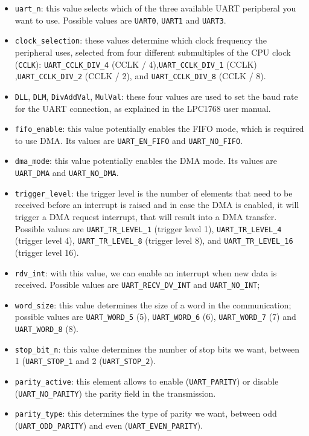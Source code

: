 \begin{itemize}
    \item \texttt{uart\_n}: this value selects which of the three available UART peripheral you want to use. Possible values are \texttt{UART0}, \texttt{UART1} and \texttt{UART3}. 
    \item \texttt{clock\_selection}: these values determine which clock frequency the peripheral uses, selected from four different submultiples of the CPU clock (\texttt{CCLK}): \texttt{UART\_CCLK\_DIV\_4} (CCLK / 4),\texttt{UART\_CCLK\_DIV\_1} (CCLK) ,\texttt{UART\_CCLK\_DIV\_2} (CCLK / 2), and \texttt{UART\_CCLK\_DIV\_8} (CCLK / 8).
    \item \texttt{DLL}, \texttt{DLM}, \texttt{DivAddVal}, \texttt{MulVal}: these four values are used to set the baud rate for the UART connection, as explained in the LPC1768 user manual.
    \item \texttt{fifo\_enable}: this value potentially enables the FIFO mode, which is required to use DMA. Its values are \texttt{UART\_EN\_FIFO} and \texttt{UART\_NO\_FIFO}.
    \item \texttt{dma\_mode}: this value potentially enables the DMA mode. Its values are \texttt{UART\_DMA} and \texttt{UART\_NO\_DMA}.
    \item \texttt{trigger\_level}: the trigger level is the number of elements that need to be received before an interrupt is raised and in case the DMA is enabled, it will trigger a DMA request interrupt, that will result into a DMA transfer. Possible values are \texttt{UART\_TR\_LEVEL\_1} (trigger level 1), \texttt{UART\_TR\_LEVEL\_4} (trigger level 4), \texttt{UART\_TR\_LEVEL\_8} (trigger level 8), and \texttt{UART\_TR\_LEVEL\_16} (trigger level 16).
    \item \texttt{rdv\_int}: with this value, we can enable an interrupt when new data is received. Possible values are \texttt{UART\_RECV\_DV\_INT} and \texttt{UART\_NO\_INT};
    \item \texttt{word\_size}: this value determines the size of a word in the communication; possible values are \texttt{UART\_WORD\_5} (5), \texttt{UART\_WORD\_6} (6), \texttt{UART\_WORD\_7} (7) and \texttt{UART\_WORD\_8} (8).
    \item \texttt{stop\_bit\_n}: this value determines the number of stop bits we want, between 1 (\texttt{UART\_STOP\_1} and 2 (\texttt{UART\_STOP\_2}). 
    \item \texttt{parity\_active}: this element allows to enable (\texttt{UART\_PARITY}) or disable (\texttt{UART\_NO\_PARITY}) the parity field in the transmission.
    \item \texttt{parity\_type}: this determines the type of parity we want, between odd (\texttt{UART\_ODD\_PARITY}) and even (\texttt{UART\_EVEN\_PARITY}). 
\end{itemize}
